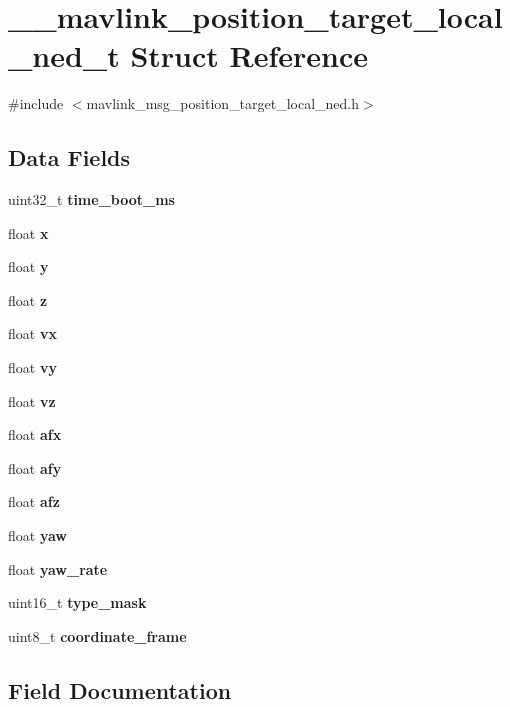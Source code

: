 \section{\+\_\+\+\_\+mavlink\+\_\+position\+\_\+target\+\_\+local\+\_\+ned\+\_\+t Struct Reference}
\label{struct____mavlink__position__target__local__ned__t}


{\ttfamily \#include $<$mavlink\+\_\+msg\+\_\+position\+\_\+target\+\_\+local\+\_\+ned.\+h$>$}

\subsection*{Data Fields}
\begin{DoxyCompactItemize}
\item 
uint32\+\_\+t \textbf{ time\+\_\+boot\+\_\+ms}
\item 
float \textbf{ x}
\item 
float \textbf{ y}
\item 
float \textbf{ z}
\item 
float \textbf{ vx}
\item 
float \textbf{ vy}
\item 
float \textbf{ vz}
\item 
float \textbf{ afx}
\item 
float \textbf{ afy}
\item 
float \textbf{ afz}
\item 
float \textbf{ yaw}
\item 
float \textbf{ yaw\+\_\+rate}
\item 
uint16\+\_\+t \textbf{ type\+\_\+mask}
\item 
uint8\+\_\+t \textbf{ coordinate\+\_\+frame}
\end{DoxyCompactItemize}


\subsection{Field Documentation}
\mbox{\label{struct____mavlink__position__target__local__ned__t_a7db44bb9672bc444e2aeab70335bb864}} 
